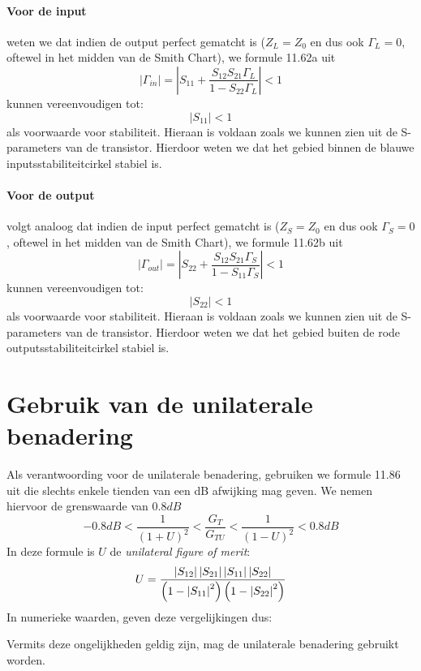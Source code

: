     \paragraph{Voor de input} weten we dat indien de output perfect gematcht is ($Z_L = Z_0$ en dus ook $\Gamma_L = 0$, oftewel in het midden van de Smith Chart), we formule 11.62a uit \cite{Pozar}
    \[
      \left| \Gamma_{in} \right| = \left| S_{11} + \frac{S_{12}S_{21}\Gamma_L}{1 - S_{22}\Gamma_L} \right| < 1
    \]
    kunnen vereenvoudigen tot:
    \[
      \left| S_{11} \right|  < 1
    \]
    als voorwaarde voor stabiliteit. Hieraan is voldaan zoals we kunnen zien uit de S-parameters van de transistor. 
    Hierdoor weten we dat het gebied binnen de blauwe inputsstabiliteitcirkel stabiel is.
    
    \paragraph{Voor de output} volgt analoog dat indien de input perfect gematcht is ($Z_S = Z_0$ en dus ook $\Gamma_S = 0$, oftewel in het midden van de Smith Chart), we formule 11.62b uit \cite{Pozar}
    \[
      \left| \Gamma_{out} \right| = \left| S_{22} + \frac{S_{12}S_{21}\Gamma_S}{1 - S_{11}\Gamma_S} \right| < 1
    \]
    kunnen vereenvoudigen tot:
    \[
      \left| S_{22} \right|  < 1
    \]
    als voorwaarde voor stabiliteit. Hieraan is voldaan zoals we kunnen zien uit de S-parameters van de transistor. 
    Hierdoor weten we dat het gebied buiten de rode outputsstabiliteitcirkel stabiel is.
    

\section{Gebruik van de unilaterale benadering}
  Als verantwoording voor de unilaterale benadering, gebruiken we formule 11.86 uit \cite{Pozar} die slechts enkele
  tienden van een dB afwijking mag geven. We nemen hiervoor de grenswaarde van $0.8 dB$
  \[
    -0.8 dB < \frac{1}{\left( 1 + U\right)^ 2} < \frac{G_T}{G_{TU}} < \frac{1}{\left( 1 - U\right)^ 2} < 0.8 dB
  \]
  In deze formule is $U$ de \textit{unilateral figure of merit}:
  \[
    U = \frac{\left| S_{12} \right| \left| S_{21} \right| \left| S_{11} \right| \left| S_{22} \right|}{ \left( 1 - \left| S_{11} \right|^2 \right) \left( 1 - \left| S_{22} \right|^2 \right)}
  \]
  In numerieke waarden, geven deze vergelijkingen dus:
    
  Vermits deze ongelijkheden geldig zijn, mag de unilaterale benadering gebruikt worden.
  
